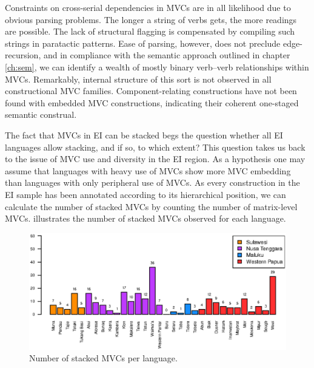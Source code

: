 Constraints on cross-serial dependencies in MVCs are in all likelihood due to obvious parsing problems. The longer a string of verbs gets, the more readings are possible. The lack of structural flagging is compensated by compiling such strings in paratactic patterns. Ease of parsing, however, does not preclude edge-recursion, and in compliance with the semantic approach outlined in chapter \ref{ch:sem}, we can identify a wealth of mostly binary verb--verb relationships within MVCs. Remarkably, internal structure of this sort is not observed in all constructional MVC families. Component-relating constructions have not been found with embedded MVC constructions, indicating their coherent one-staged semantic construal.

The fact that MVCs in EI can be stacked begs the question whether all EI languages allow stacking, and if so, to which extent? This question takes us back to the issue of MVC use and diversity in the EI region. As a hypothesis one may assume that languages with heavy use of MVCs show more MVC embedding than languages with only peripheral use of MVCs. As every construction in the EI sample has been annotated according to its hierarchical position, we can calculate the number of stacked MVCs by counting the number of matrix-level MVCs.  illustrates the number of stacked MVCs observed for each language.

\begin{figure}
\includegraphics[width=\textwidth]{figures/number_stackedMVC_clean.eps}
\caption[Number of stacked MVCs per language]{Number of stacked MVCs per language.}\label{fig:stacked}
\end{figure}

